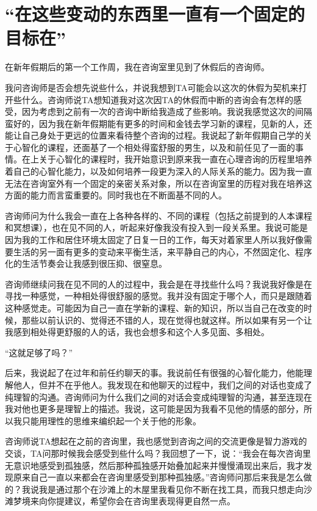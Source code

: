 \chapter{“在这些变动的东西里一直有一个固定的目标在”}



在新年假期后的第一个工作周，我在咨询室里见到了休假后的咨询师。

我问咨询师是否会想先说些什么，并说我想到TA可能会以这次的休假为契机来打开些什么。咨询师说TA想知道我对这次因TA的休假而中断的咨询会有怎样的感受，因为考虑到之前有一次的咨询中断给我造成了些影响。我说我感觉这次的间隔蛮好的，因为我在新年假期能有更多的时间和金钱去学习新的课程，见新的人，还能让自己身处于更远的位置来看待整个咨询的过程。我说起了新年假期自己学的关于心智化的课程，还面基了一个相处得蛮舒服的男生，以及和前任见了一面的事情。在上关于心智化的课程时，我开始意识到原来我一直在心理咨询的历程里培养着自己的心智化能力，以及如何培养一段更为深入的人际关系的能力。因为我一直无法在咨询室外有一个固定的亲密关系对象，所以在咨询室里的历程对我在培养这方面的能力而言蛮重要的。同时我也在不断面基不同的人。

咨询师问为什么我会一直在上各种各样的、不同的课程（包括之前提到的人本课程和冥想课），也在见不同的人，听起来好像我没有投入到一段关系里。我说可能是因为我的工作和居住环境太固定了\pozhehao{}日复一日的工作，每天对着家里人\pozhehao{}所以我好像需要生活的另一面有更多的变动来平衡生活，来平静自己的内心，不然固定化、程序化的生活节奏会让我感到很压抑、很窒息。

咨询师继续问我在见不同的人的过程中，我会是在寻找些什么吗？我说我好像是在寻找一种感觉，一种相处得很舒服的感觉。我并没有固定于哪个人，而只是跟随着这种感觉走。可能因为自己一直在学新的课程、新的知识，所以当自己在改变的时候，那些以前认识的、觉得还不错的人，现在觉得也就这样。所以如果有另一个让我感到相处得更舒服的人的话，我也会想多和这个人多见面、多相处。

\tristarsepline

“这就足够了吗？”

后来，我说起了在过年和前任约聊天的事。我说前任有很强的心智化能力，他能理解他人，但并不在乎他人。我发现在和他聊天的过程中，我们之间的对话也变成了纯理智的沟通。咨询师问为什么我们之间的对话会变成纯理智的沟通，甚至连现在我对他也更多是理智上的描述。我说，这可能是因为我看不见他的情感的部分，所以我只能用理性的思维来编织起一个关于他的形象。

咨询师说TA想起在之前的咨询里，我也感觉到咨询之间的交流更像是智力游戏的交谈，TA问那时候我会感受到些什么吗？我回想了一下，说：“我会在每次咨询里无意识地感受到孤独感，然后那种孤独感开始叠加起来并慢慢涌现出来后，我才发现原来自己一直以来都会在咨询里感受到那种孤独感。”咨询师问那后来我是怎么做的？我说我是通过那个\pozhehao{}在沙滩上的木屋里我看见你不断在找工具，而我只想走向沙滩\pozhehao{}梦境来向你提建议，希望你会在咨询里表现得更自然一点。

